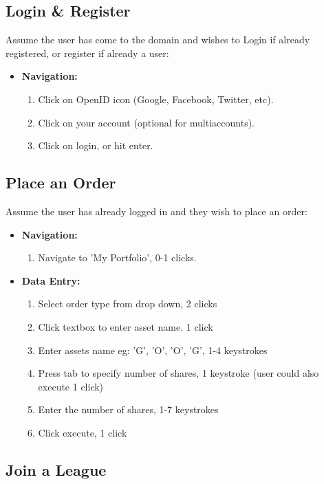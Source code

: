 \subsection{Login \& Register}

Assume the user has come to the domain and wishes to Login if already registered, or
register if already a user:\\
\begin{itemize}
\item \textbf{Navigation: }
\begin{enumerate}
\item Click on OpenID icon (Google, Facebook, Twitter, etc).
\item Click on your account (optional for multiaccounts).
\item Click on login, or hit enter.
\end{enumerate}
\end{itemize}

\subsection{Place an Order}

Assume the user has already logged in and they wish to place an order:\\

\begin{itemize}
\item \textbf{Navigation: }
\begin{enumerate}
\item Navigate to 'My Portfolio', 0-1 clicks.

\end{enumerate}
\item \textbf{Data Entry: }
\begin{enumerate}
\item Select order type from drop down, 2 clicks
\item Click textbox to enter asset name. 1 click
\item Enter assets name eg: 'G', 'O', 'O', 'G', 1-4 keystrokes
\item Press tab to specify number of shares, 1 keystroke (user could also execute 1 click)
\item Enter the number of shares, 1-7 keystrokes
\item Click execute, 1 click
\end{enumerate}
\end{itemize}

\subsection{Join a League}

